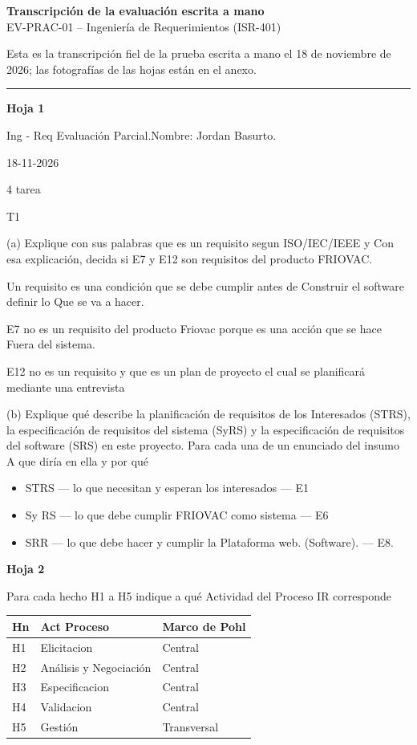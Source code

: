 \documentclass[12pt,a4paper]{article}
\begin{document}
\begin{center}
{\large \textbf{Transcripción de la evaluación escrita a mano}}\\[2pt]
EV-PRAC-01 -- Ingeniería de Requerimientos (ISR-401)
\end{center}

Esta es la transcripción fiel de la prueba escrita a mano el 18 de noviembre de 2026; las fotografías de las hojas están en el anexo.

\hrule
\vspace{6pt}

\textbf{Hoja 1}

Ing - Req Evaluación Parcial.\hfill Nombre: Jordan Basurto.

18-11-2026

4 tarea

T1

(a) Explique con sus palabras que es un requisito segun ISO/IEC/IEEE y Con esa explicación, decida si E7 y E12 son requisitos del producto FRIOVAC.

Un requisito es una condición que se debe cumplir antes de Construir el software definir lo Que se va a hacer.

E7 no es un requisito del producto Friovac porque es una acción que se hace Fuera del sistema.

E12 no es un requisito y que es un plan de proyecto el cual se planificará mediante una entrevista

(b) Explique qué describe la planificación de requisitos de los Interesados (STRS), la especificación de requisitos del sistema (SyRS) y la especificación de requisitos del software (SRS) en este proyecto. Para cada una de un enunciado del insumo A que diría en ella y por qué

\begin{itemize}[noitemsep]
\item STRS --- lo que necesitan y esperan los interesados --- E1
\item Sy RS --- lo que debe cumplir FRIOVAC como sistema --- E6
\item SRR --- lo que debe hacer y cumplir la Plataforma web. (Software). --- E8.
\end{itemize}

\newpage
\textbf{Hoja 2}

Para cada hecho H1 a H5 indique a qué Actividad del Proceso IR corresponde

\begin{center}
\begin{tabular}{|l|l|l|}
\hline
Hn & Act Proceso & Marco de Pohl \\
\hline
H1 & Elicitacion & Central \\
\hline
H2 & Análisis y Negociación & Central \\
\hline
H3 & Especificacion & Central \\
\hline
H4 & Validacion & Central \\
\hline
H5 & Gestión & Transversal \\
\hline
\end{tabular}
\end{center}
\end{document}
